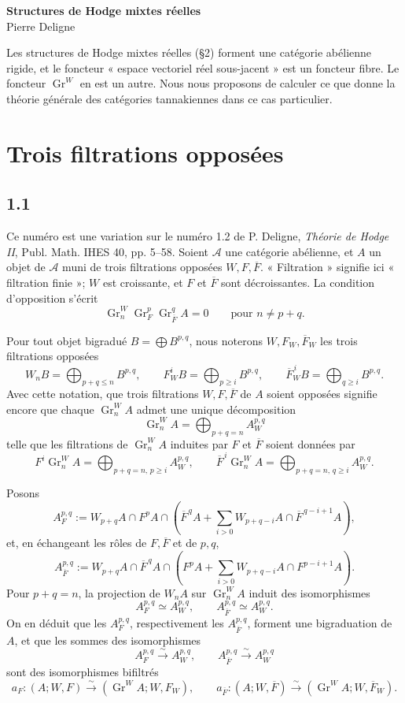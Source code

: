 \documentclass[11pt]{article}
\newcommand{\Gr}{\operatorname{Gr}}
\begin{document}
\begin{center}
 {\Large\bfseries Structures de Hodge mixtes réelles}\\[0.7em]
 {\large Pierre Deligne}\\[0.4em]
\end{center}

Les structures de Hodge mixtes réelles (§2) forment une catégorie abélienne rigide, et le foncteur « espace vectoriel réel sous-jacent » est un foncteur fibre. Le foncteur \(\Gr^W\) en est un autre. Nous nous proposons de calculer ce que donne la théorie générale des catégories tannakiennes dans ce cas particulier.

\section{Trois filtrations opposées}

\subsection*{1.1}
Ce numéro est une variation sur le numéro 1.2 de P. Deligne, \emph{Théorie de Hodge II}, Publ. Math. IHES 40, pp. 5--58. Soient \(\mathcal A\) une catégorie abélienne, et \(A\) un objet de \(\mathcal A\) muni de trois filtrations opposées \(W,F,\overline F\). « Filtration » signifie ici « filtration finie »; \(W\) est croissante, et \(F\) et \(\overline F\) sont décroissantes. La condition d'opposition s'écrit
\[
   \Gr^W_n\Gr^p_F\Gr^q_{\overline F} A=0
   \qquad\text{pour } n\ne p+q .
\]

Pour tout objet bigradué \(B=\bigoplus B^{p,q}\), nous noterons \(W,F_W,\overline F_W\) les trois filtrations opposées
\[
 W_nB=\bigoplus_{p+q\le n}B^{p,q},\qquad
 F_W^iB=\bigoplus_{p\ge i}B^{p,q},\qquad
 \overline F_W^{\,i}B=\bigoplus_{q\ge i}B^{p,q}.
\]
Avec cette notation, que trois filtrations \(W,F,\overline F\) de \(A\) soient opposées signifie encore que chaque \(\Gr^W_nA\) admet une unique décomposition
\[
   \Gr^W_nA=\bigoplus_{p+q=n} A_W^{p,q}
\]
telle que les filtrations de \(\Gr^W_nA\) induites par \(F\) et \(\overline F\) soient données par
\[
 F^i\Gr^W_nA=\bigoplus_{p+q=n,\,p\ge i}A_W^{p,q},\qquad
 \overline F^{\,i}\Gr^W_nA=\bigoplus_{p+q=n,\,q\ge i}A_W^{p,q}.
\]

Posons
\[
 A_F^{p,q}:=W_{p+q}A\cap F^pA\cap
 \left(\overline F^{\,q}A+\sum_{i>0}W_{p+q-i}A\cap \overline F^{\,q-i+1}A\right),
\]
et, en échangeant les rôles de \(F,\overline F\) et de \(p,q\),
\[
 A_{\overline F}^{p,q}:=W_{p+q}A\cap \overline F^{\,q}A\cap
 \left(F^pA+\sum_{i>0}W_{p+q-i}A\cap F^{p-i+1}A\right).
\]
Pour \(p+q=n\), la projection de \(W_nA\) sur \(\Gr^W_nA\) induit des isomorphismes
\[
 A_F^{p,q}\simeq A_W^{p,q},\qquad
 A_{\overline F}^{p,q}\simeq A_W^{p,q}.
\]
On en déduit que les \(A_F^{p,q}\), respectivement les \(A_{\overline F}^{p,q}\), forment une bigraduation de \(A\), et que les sommes des isomorphismes
\[
 A_F^{p,q}\xrightarrow{\sim}A_W^{p,q},\qquad
 A_{\overline F}^{p,q}\xrightarrow{\sim}A_W^{p,q}
\]
sont des isomorphismes bifiltrés
\[
 a_F:(A;W,F)\xrightarrow{\sim}(\Gr^WA;W,F_W),
 \qquad
 a_{\overline F}:(A;W,\overline F)\xrightarrow{\sim}(\Gr^WA;W,\overline F_W).
\]
\end{document}
